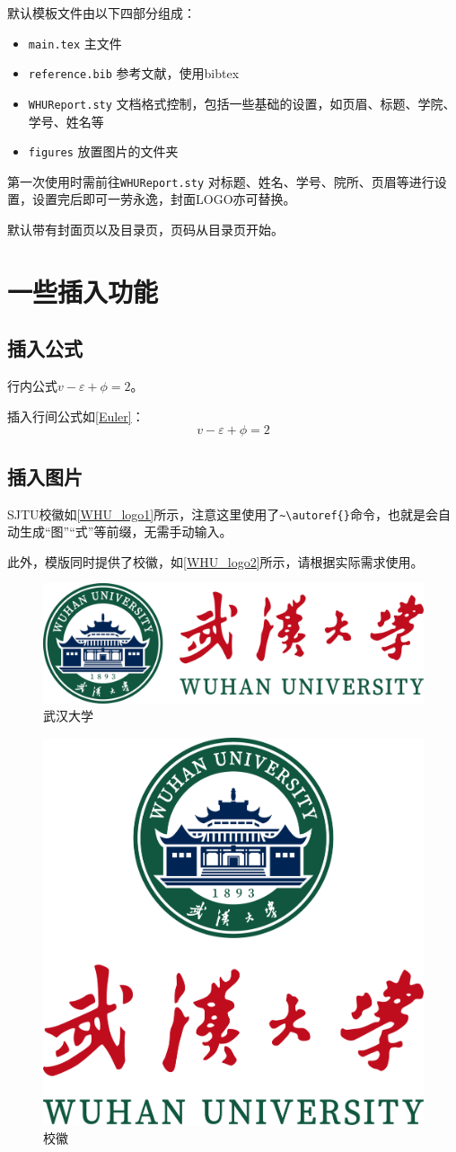 \documentclass[12pt,hyperref,a4paper,UTF8]{ctexart}
\begin{document}
默认模板文件由以下四部分组成：
\begin{itemize}
    \item \texttt{main.tex} 主文件
    \item \texttt{reference.bib} 参考文献，使用bibtex
    \item \texttt{WHUReport.sty} 文档格式控制，包括一些基础的设置，如页眉、标题、学院、学号、姓名等
    \item \texttt{figures} 放置图片的文件夹
\end{itemize}

第一次使用时需前往\texttt{WHUReport.sty} 对标题、姓名、学号、院所、页眉等进行设置，设置完后即可一劳永逸，封面LOGO亦可替换。

默认带有封面页以及目录页，页码从目录页开始。
\section{一些插入功能}
\subsection{插入公式}
行内公式$v-\varepsilon+\phi=2$。

插入行间公式如\autoref{Euler}：
\begin{equation}
    v-\varepsilon+\phi=2
    \label{Euler}
\end{equation}

\subsection{插入图片}
SJTU校徽如\autoref{WHU_logo1}所示，注意这里使用了\verb|~\autoref{}|命令，也就是会自动生成“图”“式”等前缀，无需手动输入。

此外，模版同时提供了校徽，如\autoref{WHU_logo2}所示，请根据实际需求使用。
\begin{figure}[!htbp]
    \centering
    \includegraphics[width =.5\textwidth]{figures/whu_logo1.png}
    \caption{武汉大学}
    \label{WHU_logo1}
\end{figure}

\begin{figure}[!htbp]
    \centering
    \includegraphics[width =.4\textwidth]{figures/whu_logo2.png}
    \caption{校徽}
    \label{WHU_logo2}
\end{figure}
\end{document}
